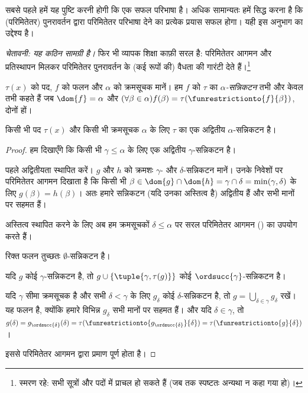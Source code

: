 \documentclass[../../../include/open-logic-section]{subfiles}
\begin{document}

सबसे पहले हमें यह पुष्टि करनी होगी कि  एक सफल
परिभाषा है। अधिक सामान्यतः हमें सिद्ध करना है कि (परिमितेतर) पुनरावर्तन
द्वारा परिमितेतर परिभाषा देने का प्रत्येक प्रयास सफल होगा। यही इस अनुभाग का
उद्देश्य है।

\emph{चेतावनी: यह कठिन सामग्री है।} फिर भी व्यापक शिक्षा काफ़ी सरल है:
परिमितेतर आगमन और प्रतिस्थापन मिलकर परिमितेतर पुनरावर्तन के (कई रूपों की)
वैधता की गारंटी देते हैं।\footnote{स्मरण रहे: सभी सूत्रों और पदों में प्राचल
हो सकते हैं (जब तक स्पष्टतः अन्यथा न कहा गया हो)।}

\begin{defn}
	$\tau(x)$ को पद, $f$ को फलन और $\alpha$ को क्रमसूचक मानें। हम $f$ को
	$\tau$ का \emph{$\alpha$-सन्निकटन} तभी और केवल तभी कहते हैं जब
	$\dom{f} = \alpha$ और
	$(\forall \beta \in \alpha)f(\beta) =
	\tau(\funrestrictionto{f}{\beta})$, दोनों हों।
\end{defn}

\begin{lem}[परिबद्ध पुनरावर्तन]
किसी भी पद $\tau(x)$ और किसी भी क्रमसूचक $\alpha$ के लिए $\tau$ का एक
अद्वितीय $\alpha$-सन्निकटन है।
\end{lem}
\begin{proof}
हम दिखाएँगे कि किसी भी $\gamma \leq \alpha$ के लिए एक अद्वितीय
$\gamma$-सन्निकटन है।

पहले अद्वितीयता स्थापित करें। $g$ और $h$ को क्रमशः $\gamma$- और
$\delta$-सन्निकटन मानें। उनके निवेशों पर परिमितेतर आगमन दिखाता है कि किसी भी
$\beta \in \dom{g} \cap \dom{h} = \gamma \cap \delta =
\min(\gamma, \delta)$ के लिए $g(\beta) = h(\beta)$। अतः हमारे सन्निकटन
(यदि उनका अस्तित्व है) अद्वितीय हैं और सभी मानों पर सहमत हैं।

अस्तित्व स्थापित करने के लिए अब हम क्रमसूचकों $\delta \leq \alpha$ पर सरल
परिमितेतर आगमन () का उपयोग करते
हैं।

रिक्त फलन तुच्छतः $\emptyset$-सन्निकटन है।

यदि $g$ कोई $\gamma$-सन्निकटन है, तो
$g \cup \{\tuple{\gamma, \tau(g)}\}$ कोई
$\ordsucc{\gamma}$-सन्निकटन है।

यदि $\gamma$ सीमा क्रमसूचक है और सभी $\delta < \gamma$ के लिए $g_\delta$
कोई $\delta$-सन्निकटन है, तो $g = \bigcup_{\delta \in \gamma} g_\delta$
रखें। यह फलन है, क्योंकि हमारे विभिन्न $g_\delta$ सभी मानों पर सहमत हैं।
और यदि $\delta \in \gamma$, तो
$g(\delta) = g_{\ordsucc{\delta}}(\delta) =
\tau(\funrestrictionto{g_{\ordsucc{\delta}}}{\delta}) =
\tau(\funrestrictionto{g}{\delta})$।

इससे परिमितेतर आगमन द्वारा प्रमाण पूर्ण होता है।
\end{proof}
\end{document}
